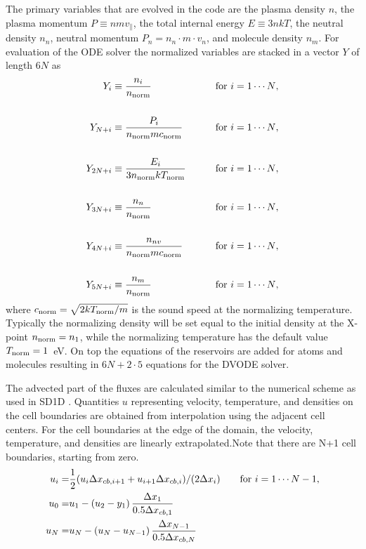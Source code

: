 \documentclass[amsmath,amssymb,a4]{revtex4-2}
\begin{document}
The primary variables that are evolved in the code are the plasma density $n$, the plasma momentum $P \equiv n m v_\parallel$, the total internal energy $E \equiv 3 n k T$, the neutral density $n_n$, neutral momentum $P_n = n_n\cdot m \cdot v_n$, and molecule density  $n_m$. For evaluation of the ODE solver the normalized variables are stacked in a vector $Y$ of length $6N$ as
\begin{eqnarray}
    Y_i        &\equiv {\displaystyle n_i \over n_{\rm norm} } &\quad\quad\hbox{for $i = 1 \cdots N$}, \nonumber \\ \nonumber \\
    Y_{N + i}  &\equiv {\displaystyle P_i \over n_{\rm norm} m c_{\rm norm} } &\quad\quad\hbox{for $i = 1 \cdots N$}, \nonumber \\ \label{solution_vector} \\
    Y_{2N + i} &\equiv {\displaystyle E_i \over 3 n_{\rm norm} k T_{\rm norm} } &\quad\quad\hbox{for $i = 1 \cdots N$},  \nonumber\\ \nonumber \\
    Y_{3N + i} &\equiv {\displaystyle n_n \over n_{\rm norm} } &\quad\quad\hbox{for $i = 1 \cdots N$}, \nonumber \\ \nonumber \\
     Y_{4N + i} &\equiv {\displaystyle n_{nv} \over n_{\rm norm} m c_{\rm norm} } &\quad\quad\hbox{for $i = 1 \cdots N$}, \nonumber\\ \nonumber \\
      Y_{5N + i} &\equiv {\displaystyle n_m \over n_{\rm norm} } &\quad\quad\hbox{for $i = 1 \cdots N$}, \nonumber
\end{eqnarray}
where $c_{\rm norm} = \sqrt{2 k T_{\rm norm}/m}$ is the sound speed at the normalizing temperature. Typically the normalizing density will be set equal to the initial density at the X-point $n_{\rm norm} = n_1$, while the normalizing temperature has the default value $T_{\rm norm} = 1$~eV. On top the equations of the reservoirs are added for atoms and molecules resulting in $6N + 2\cdot 5$ equations for the DVODE solver.

The advected part of the fluxes are calculated similar to the numerical scheme as used in SD1D \cite{SD1D}. Quantities $u$ representing velocity, temperature, and densities on the cell boundaries are obtained from interpolation using the adjacent cell centers. For the cell boundaries at the edge of the domain, the velocity, temperature, and densities are linearly extrapolated.Note that there are N+1 cell boundaries, starting from zero.
\begin{eqnarray} \label{eq:cc2cb}
    u_i =& \frac{1}{2} (u_{i}\Delta x_{cb,i+1} + u_{i+1}\Delta x_{cb,i} ) / (2\Delta x_{i})  \quad \quad \hbox{for $i = 1 \cdots N-1$},\\ 
    u_0 =& u_1 - \left(u_2 - y_1\right) \frac{\Delta x_1}{0.5 \Delta x_{cb,1}} \\ 
    u_N =& u_N - \left(u_N - u_{N-1}\right) \frac{\Delta x_{N-1}}{0.5 \Delta x_{cb,N}} \\ 
\end{eqnarray}
\end{document}
